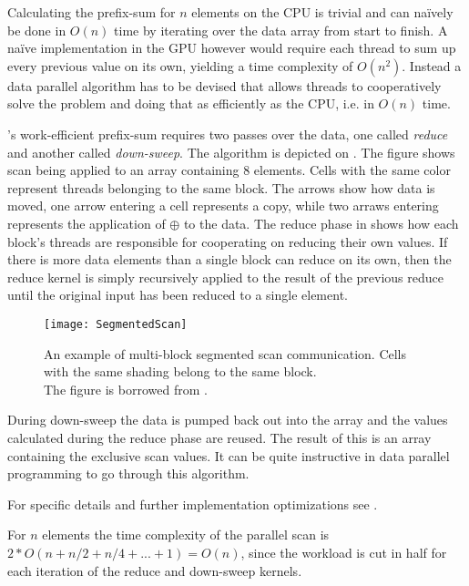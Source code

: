 Calculating the prefix-sum for $n$ elements on the CPU is trivial and
can naïvely be done in $O(n)$ time by iterating over the data array
from start to finish. A naïve implementation in the GPU however would
require each thread to sum up every previous value on its own,
yielding a time complexity of $O(n^2)$. Instead a data parallel
algorithm has to be devised that allows threads to cooperatively solve
the problem and doing that as efficiently as the CPU, i.e. in $O(n)$
time.



\sengupta{}'s work-efficient prefix-sum requires two passes over the data, one
called \textit{reduce} and another called \textit{down-sweep}. The algorithm is
depicted on . The figure shows scan being applied to an
array containing 8 elements. Cells with the same color represent threads
belonging to the same block. The arrows show how data is moved, one arrow
entering a cell represents a copy, while two arraws entering represents the
application of $\oplus$ to the data. The reduce phase in 
shows how each block's threads are responsible for cooperating on reducing their
own values. If there is more data elements than a single block can reduce on its
own, then the reduce kernel is simply recursively applied to the result of the
previous reduce until the original input has been reduced to a single element.

\begin{figure}
  \centering
  \texttt{[image: SegmentedScan]}

  \parbox{5cm}{\caption[Multi-block segmented scan communication.]{An
      example of multi-block segmented scan communication. Cells with
      the same shading belong to the same block. \\The figure is
      borrowed from .}\label{fig:segScan}}
\end{figure}

During down-sweep the data is pumped back out into the array and the
values calculated during the reduce phase are reused. The result of
this is an array containing the exclusive scan values. It can be quite
instructive in data parallel programming to go through this algorithm.

For specific details and further implementation optimizations see
\sengupta{}.



For $n$ elements the time complexity of the parallel scan is $2 * O(n
+ n/2 + n/4 + ... + 1) = O(n)$, since the workload is cut in half for
each iteration of the reduce and down-sweep kernels.


